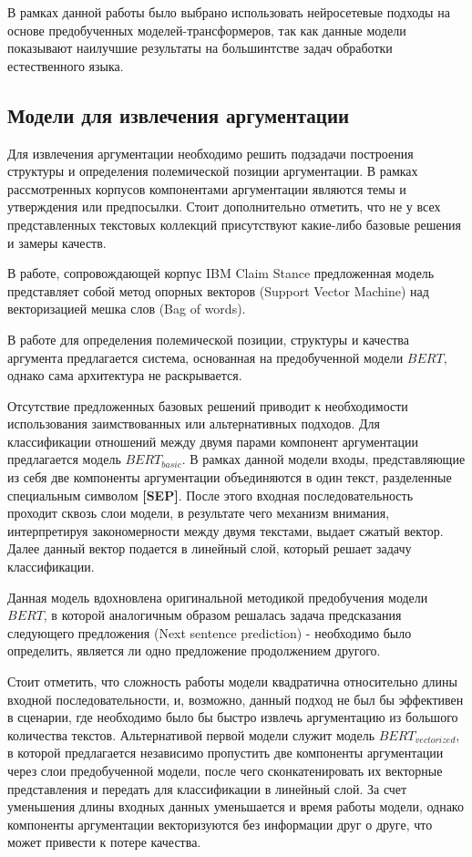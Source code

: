 В рамках данной работы было выбрано использовать нейросетевые подходы на основе предобученных моделей-трансформеров, так как данные модели показывают наилучшие результаты на большинтстве задач обработки естественного языка.

\subsection{Модели для извлечения аргументации}
Для извлечения аргументации необходимо решить подзадачи построения структуры и определения полемической позиции аргументации. В рамках рассмотренных корпусов компонентами аргументации являются темы и утверждения или предпосылки. Стоит дополнительно отметить, что не у всех представленных текстовых коллекций присутствуют какие-либо базовые решения и замеры качеств.

В работе, сопровождающей корпус IBM Claim Stance \cite{bar2017stance} предложенная модель представляет собой метод опорных векторов (Support Vector Machine) над векторизацией мешка слов (Bag of words). 

В работе \cite{toledo2020multilingual} для определения полемической позиции, структуры и качества аргумента предлагается система, основанная на предобученной модели $BERT$, однако сама архитектура не раскрывается.

Отсутствие предложенных базовых решений приводит к необходимости использования заимствованных или альтернативных подходов. Для классификации отношений между двумя парами компонент аргументации предлагается модель $BERT_{basic}$. В рамках данной модели входы, представляющие из себя две компоненты аргументации объединяются в один текст, разделенные специальным символом \textbf{[SEP]}. После этого входная последовательность проходит сквозь слои модели, в результате чего механизм внимания, интерпретируя закономерности между двумя текстами, выдает сжатый вектор. Далее данный вектор подается в линейный слой, который решает задачу классификации.

Данная модель вдохновлена оригинальной методикой предобучения модели $BERT$, в которой аналогичным образом решалась задача предсказания следующего предложения (Next sentence prediction) - необходимо было определить, является ли одно предложение продолжением другого. 

Стоит отметить, что сложность работы модели квадратична относительно длины входной последовательности, и, возможно, данный подход не был бы эффективен в сценарии, где необходимо было бы быстро извлечь аргументацию из большого количества текстов. Альтернативой первой модели служит модель $BERT_{vectorized}$, в которой предлагается независимо пропустить две компоненты аргументации через слои предобученной модели, после чего сконкатенировать их векторные представления и передать для классификации в линейный слой. За счет уменьшения длины входных данных уменьшается и время работы модели, однако компоненты аргументации векторизуются без информации друг о друге, что может привести к потере качества.

